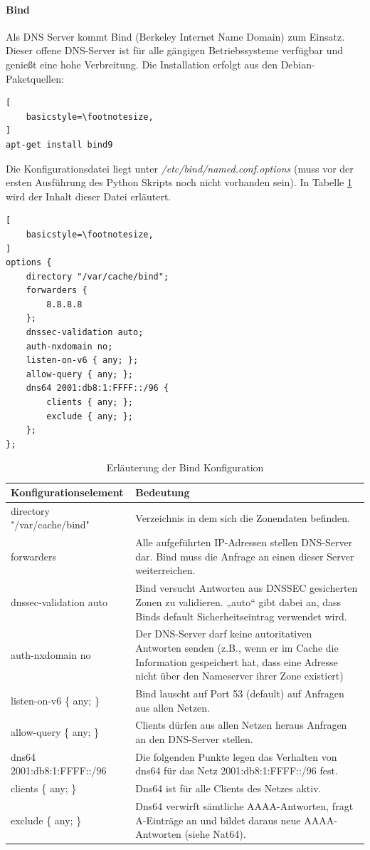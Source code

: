 \paragraph*{Bind}
Als DNS Server kommt Bind (Berkeley Internet Name Domain) zum Einsatz. Dieser offene DNS-Server ist für alle gängigen Betriebssysteme verfügbar und genießt eine hohe Verbreitung. Die Installation erfolgt aus den Debian-Paketquellen:
\lstset{language=bash}
\begin{lstlisting}[
	basicstyle=\footnotesize,
]
apt-get install bind9
\end{lstlisting}

Die Konfigurationsdatei liegt unter \textit{/etc/bind/named.conf.options} (muss vor der ersten Ausführung des Python Skripts noch nicht vorhanden sein). In Tabelle \ref{tab:bindConfig} wird der Inhalt dieser Datei erläutert.
\begin{lstlisting}[
	basicstyle=\footnotesize,
]
options {
	directory "/var/cache/bind";
	forwarders {
		8.8.8.8
	};
	dnssec-validation auto;
	auth-nxdomain no;
	listen-on-v6 { any; };
	allow-query { any; };
	dns64 2001:db8:1:FFFF::/96 {
		clients { any; };
		exclude { any; };
	};
};
\end{lstlisting}

\begin{table}
	\begin{tabular}{lp{9cm}}
		Konfigurationselement & Bedeutung \\ \hline
		directory "/var/cache/bind" & Verzeichnis in dem sich die Zonendaten befinden. \\
		forwarders & Alle aufgeführten IP-Adressen stellen DNS-Server dar. Bind muss die Anfrage an einen dieser Server weiterreichen. \\
		dnssec-validation auto & Bind versucht Antworten aus DNSSEC gesicherten Zonen zu validieren. „auto“ gibt dabei an, dass Binds default Sicherheitseintrag verwendet wird. \\
		auth-nxdomain no & Der DNS-Server darf keine autoritativen Antworten senden (z.B., wenn er im Cache die Information gespeichert hat, dass eine Adresse nicht über den Nameserver ihrer Zone existiert) \\
		listen-on-v6 \{ any; \} & Bind lauscht auf Port 53 (default) auf Anfragen aus allen Netzen. \\
		allow-query \{ any; \} & Clients dürfen aus allen Netzen heraus Anfragen an den DNS-Server stellen. \\
		dns64 2001:db8:1:FFFF::/96 & Die folgenden Punkte legen das Verhalten von dns64 für das Netz 2001:db8:1:FFFF::/96 fest. \\
		clients \{ any; \} & Dns64 ist für alle Clients des Netzes aktiv. \\
		exclude \{ any; \} & Dns64 verwirft sämtliche AAAA-Antworten, fragt A-Einträge an und bildet daraus neue AAAA-Antworten (siehe Nat64). \\
	\end{tabular}
	\caption{Erläuterung der Bind Konfiguration}
	\label{tab:bindConfig}
\end{table}

